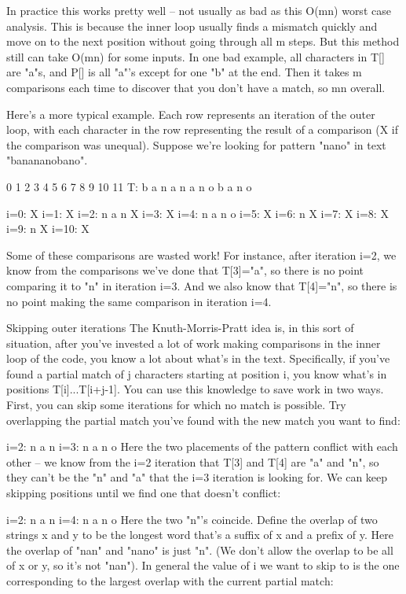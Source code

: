 In practice this works pretty well -- not usually as bad as this O(mn) worst case analysis. This is because the inner loop usually finds a mismatch quickly and move on to the next position without going through all m steps. But this method still can take O(mn) for some inputs. In one bad example, all characters in T[] are "a"s, and P[] is all "a"'s except for one "b" at the end. Then it takes m comparisons each time to discover that you don't have a match, so mn overall.

Here's a more typical example. Each row represents an iteration of the outer loop, with each character in the row representing the result of a comparison (X if the comparison was unequal). Suppose we're looking for pattern "nano" in text "banananobano".

 0  1  2  3  4  5  6  7  8  9 10 11
  T: b  a  n  a  n  a  n  o  b  a  n  o

i=0: X
i=1:    X
i=2:       n  a  n  X
i=3:          X
i=4:             n  a  n  o
i=5:                X
i=6:                   n  X
i=7:                         X
i=8:                            X
i=9:                               n  X
i=10:                                 X

Some of these comparisons are wasted work! For instance, after iteration i=2, we know from the comparisons we've done that T[3]="a", so there is no point comparing it to "n" in iteration i=3. And we also know that T[4]="n", so there is no point making the same comparison in iteration i=4.

Skipping outer iterations
The Knuth-Morris-Pratt idea is, in this sort of situation, after you've invested a lot of work making comparisons in the inner loop of the code, you know a lot about what's in the text. Specifically, if you've found a partial match of j characters starting at position i, you know what's in positions T[i]...T[i+j-1]. You can use this knowledge to save work in two ways. First, you can skip some iterations for which no match is possible. Try overlapping the partial match you've found with the new match you want to find:

    i=2: n  a  n
    i=3:    n  a  n  o
Here the two placements of the pattern conflict with each other -- we know from the i=2 iteration that T[3] and T[4] are "a" and "n", so they can't be the "n" and "a" that the i=3 iteration is looking for. We can keep skipping positions until we find one that doesn't conflict:

    i=2: n  a  n
    i=4:       n  a  n  o
Here the two "n"'s coincide. Define the overlap of two strings x and y to be the longest word that's a suffix of x and a prefix of y. Here the overlap of "nan" and "nano" is just "n". (We don't allow the overlap to be all of x or y, so it's not "nan"). In general the value of i we want to skip to is the one corresponding to the largest overlap with the current partial match:

